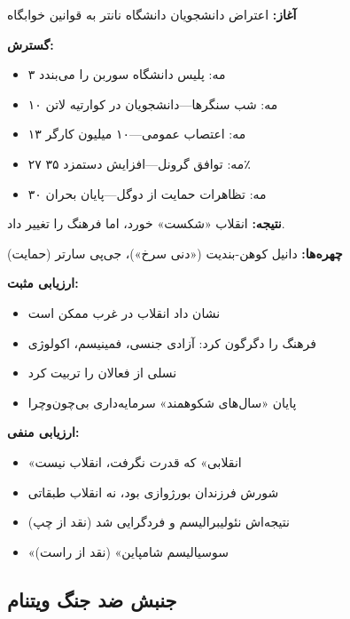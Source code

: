 \begin{historybox}[مه ۱۹۶۸ پاریس]
\textbf{آغاز:} اعتراض دانشجویان دانشگاه نانتر به قوانین خوابگاه

\textbf{گسترش:}
\begin{itemize}[nosep]
    \item ۳ مه: پلیس دانشگاه سوربن را می‌بندد
    \item ۱۰ مه: شب سنگرها—دانشجویان در کوارتیه لاتن
    \item ۱۳ مه: اعتصاب عمومی—۱۰ میلیون کارگر
    \item ۲۷ مه: توافق گرونل—افزایش دستمزد ۳۵٪
    \item ۳۰ مه: تظاهرات حمایت از دوگل—پایان بحران
\end{itemize}

\textbf{نتیجه:} انقلاب «شکست» خورد، اما فرهنگ را تغییر داد.

\textbf{چهره‌ها:} دانیل کوهن-بندیت («دنی سرخ»)، جی‌پی سارتر (حمایت)
\end{historybox}

\begin{debatebox}
\textbf{ارزیابی مثبت:}
\begin{itemize}[nosep]
    \item نشان داد انقلاب در غرب ممکن است
    \item فرهنگ را دگرگون کرد: آزادی جنسی، فمینیسم، اکولوژی
    \item نسلی از فعالان را تربیت کرد
    \item پایان «سال‌های شکوهمند» سرمایه‌داری بی‌چون‌وچرا
\end{itemize}

\textbf{ارزیابی منفی:}
\begin{itemize}[nosep]
    \item «انقلابی» که قدرت نگرفت، انقلاب نیست
    \item شورش فرزندان بورژوازی بود، نه انقلاب طبقاتی
    \item نتیجه‌اش نئولیبرالیسم و فردگرایی شد (نقد از چپ)
    \item «سوسیالیسم شامپاین» (نقد از راست)
\end{itemize}
\end{debatebox}

\subsection{جنبش ضد جنگ ویتنام}


